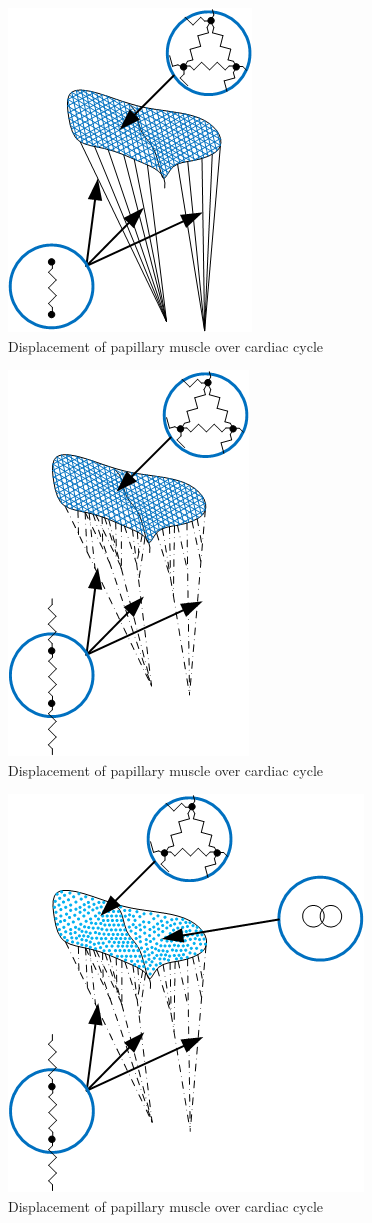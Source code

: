 \begin{figure}[H]\label{fig:pc1}
  \centering
  \includegraphics[width=0.35\columnwidth]{./fig/pc1.png}
  \caption{Displacement of papillary muscle over cardiac cycle}
\end{figure}
\begin{figure}[H]\label{fig:pc2}
  \centering
  \includegraphics[width=0.35\columnwidth]{./fig/pc2.png}
  \caption{Displacement of papillary muscle over cardiac cycle}
\end{figure}
\begin{figure}[H]\label{fig:pc3}
  \centering
  \includegraphics[width=0.45\columnwidth]{./fig/pc3.png}
  \caption{Displacement of papillary muscle over cardiac cycle}
\end{figure}
